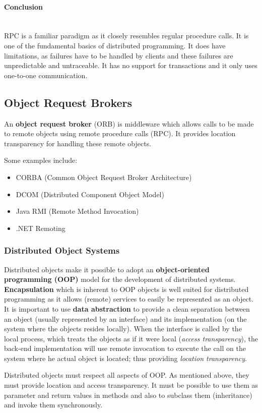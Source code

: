 \documentclass[a4paper]{article}
\newcommand{\subsubsubsection}[1]{\paragraph{#1}\mbox{}\\}
\begin{document}
\subsubsubsection{Conclusion}

RPC is a familiar paradigm as it closely resembles regular procedure calls. It is one of the fundamental basics of distributed programming. It does have limitations, as failures have to be handled by clients and these failures are unpredictable and untraceable. It has no support for transactions and it only uses one-to-one communication.

\subsection{Object Request Brokers}

An \textbf{object request broker} (ORB) is middleware which allows calls to be made to remote objects using remote procedure calls (RPC). It provides location transparency for handling these remote objects.

Some examples include:
\begin{itemize}
\item CORBA (Common Object Request Broker Architecture)
\item DCOM (Distributed Component Object Model)
\item Java RMI (Remote Method Invocation)
\item .NET Remoting
\end{itemize}

\subsubsection{Distributed Object Systems}

Distributed objects make it possible to adopt an \textbf{object-oriented programming (OOP)} model for the development of distributed systems. \textbf{Encapsulation} which is inherent to OOP objects is well suited for distributed programming as it allows (remote) services to easily be represented as an object. It is important to use \textbf{data abstraction} to provide a clean separation between an object (usually represented by an interface) and its implementation (on the system where the objects resides locally). When the interface is called by the local process, which treats the objects as if it were local (\textit{access transparency}), the back-end implementation will use remote invocation to execute the call on the system where he actual object is located; thus providing \textit{location transparency}.

Distributed objects must respect all aspects of OOP. As mentioned above, they must provide location and access transparency. It must be possible to use them as parameter and return values in methods and also to subclass them (inheritance) and invoke them synchronously.
\end{document}
